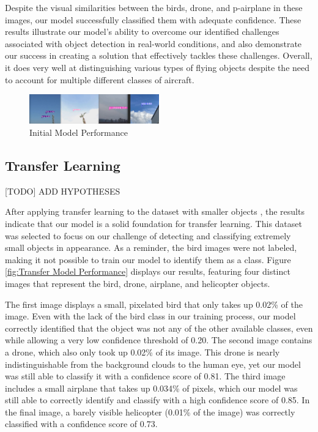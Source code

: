\documentclass[10pt,twocolumn,letterpaper]{article}
\begin{document}
Despite the visual similarities between the birds, drone, and p-airplane in these images, our model successfully classified them with adequate confidence. These results illustrate our model's ability to overcome our identified challenges associated with object detection in real-world conditions, and also demonstrate our success in creating a solution that effectively tackles these challenges. Overall, it does very well at distinguishing various types of flying objects despite the need to account for multiple different classes of aircraft.

\begin{figure}[h]
    \centering
    \includegraphics[width=0.5\textwidth]{figures/original_model.png}
    \caption{Initial Model Performance \cite{InitialDataset}}
    \label{fig:Initial Model Performance}
\end{figure}

\subsection{Transfer Learning}

[TODO] ADD HYPOTHESES

After applying transfer learning to the dataset with smaller objects \cite{TransferDataset}, the results indicate that our model is a solid foundation for transfer learning. This dataset was selected to focus on our challenge of detecting and classifying extremely small objects in appearance. As a reminder, the bird images were not labeled, making it not possible to train our model to identify them as a class. Figure \ref{fig:Transfer Model Performance} displays our results, featuring four distinct images that represent the bird, drone, airplane, and helicopter objects.

The first image displays a small, pixelated bird that only takes up 0.02\% of the image. Even with the lack of the bird class in our training process, our model correctly identified that the object was not any of the other available classes, even while allowing a very low confidence threshold of 0.20. The second image contains a drone, which also only took up 0.02\% of its image. This drone is nearly indistinguishable from the background clouds to the human eye, yet our model was still able to classify it with a confidence score of 0.81. The third image includes a small airplane that takes up 0.034\% of pixels, which our model was still able to correctly identify and classify with a high confidence score of 0.85. In the final image, a barely visible helicopter (0.01\% of the image) was correctly classified with a confidence score of 0.73.
\end{document}

